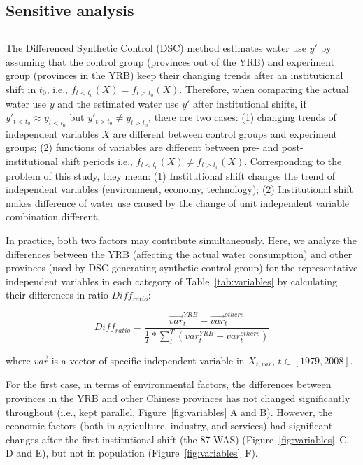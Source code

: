 \graphicspath{{../../../figs/}}

\subsection*{Sensitive analysis}

\subsection*{}

The Differenced Synthetic Control (DSC) method estimates water use $y'$ by assuming that the control group (provinces out of the YRB) and experiment group (provinces in the YRB) keep their changing trends after an institutional shift in $t_0$, i.e., $f_{t<t_0}(X) = f_{t>t_0}(X)$.
Therefore, when comparing the actual water use $y$ and the estimated water use $y'$ after institutional shifts, if $y'_{t<t_0} \approx y_{t<t_0}$ but $y'_{t>t_0} \neq y_{t>t_0}$, there are two cases: (1) changing trends of independent variables $X$ are different between control groups and experiment groups; (2) functions of variables are different between pre- and post- institutional shift periods i.e., $f_{t<t_0}(X) \neq f_{t>t_0}(X)$.
Corresponding to the problem of this study, they mean: (1) Institutional shift changes the trend of independent variables (environment, economy, technology); (2) Institutional shift makes difference of water use caused by the change of unit independent variable combination different.

In practice, both two factors may contribute simultaneously.
Here, we analyze the differences between the YRB (affecting the actual water consumption) and other provinces (used by DSC generating synthetic control group) for the representative independent variables in each category of Table~\ref{tab:variables} by calculating their differences in ratio $Diff_{ratio}$:

\begin{equation}
    Diff_{ratio} = \frac{\vec{var}^{YRB}_{t} - \vec{var}^{others}_{t}}{\frac{1}{T} * \sum_{t}^T (var^{YRB}_{t} - var^{others}_{t})}
\end{equation}

where $\vec{var}$ is a vector of specific independent variable in $X_{t, var}$, $t\in [1979, 2008]$.

For the first case, in terms of environmental factors, the differences between provinces in the YRB and other Chinese provinces has not changed significantly throughout (i.e., kept parallel, Figure~\ref{fig:variables} A and B). However, the economic factors (both in agriculture, industry, and services) had significant changes after the first institutional shift (the 87-WAS) (Figure~\ref{fig:variables}~C, D and E), but not in population (Figure~\ref{fig:variables}~F).

